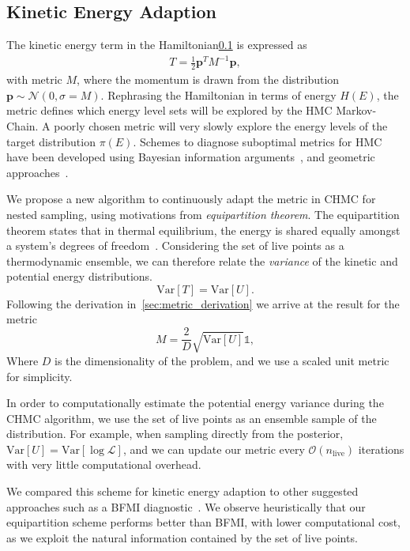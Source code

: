 \documentclass[11pt]{article}
\begin{document}
    \subsection{Kinetic Energy Adaption}
    The kinetic energy term in the Hamiltonian\ref{} is expressed as
    \begin{equation}\label{eq:kinetic_energy}
    \begin{aligned}
        T = \frac{1}{2} \mathbf{p}^T M^{-1} \mathbf{p},
    \end{aligned}
    \end{equation}
    with metric $M$, where the momentum is drawn from the distribution $\mathbf{p} \sim \mathcal{N}(0, \sigma = M)$.
    Rephrasing the Hamiltonian in terms of energy $H(E)$, the metric defines which energy level sets will be explored
    by the HMC Markov-Chain.
    A poorly chosen metric will very slowly explore the energy levels of the target distribution $\pi(E)$.
    Schemes to diagnose suboptimal metrics for HMC have been developed using Bayesian information
    arguments~\cite{betancourt2016energymetric}, and geometric approaches~\cite{bales2019_hmc_metric}.

    We propose a new algorithm to continuously adapt the metric in CHMC for nested sampling, using motivations
    from \emph{equipartition theorem}.
    The equipartition theorem states that in thermal equilibrium, the energy is shared equally amongst a system's degrees
    of freedom~\cite{landau1972theoretical}.
    Considering the set of live points as a thermodynamic ensemble, we can therefore relate the \emph{variance} of the
    kinetic and potential energy distributions.
    \begin{equation}\label{eq:equipartition_theorem}
        \mathrm{Var}[T] = \mathrm{Var}[U].
    \end{equation}
    Following the derivation in~\ref{sec:metric_derivation} we arrive at the result for the metric
    \begin{equation}\label{eq:metric_adaption}
        M = \frac{2}{D} \sqrt{\mathrm{Var}[U]} \mathbb{1},
    \end{equation}
    Where $D$ is the dimensionality of the problem, and we use a scaled unit metric for simplicity.

    In order to computationally estimate the potential energy variance during the CHMC algorithm, we use the
    set of live points as an ensemble sample of the distribution.
    For example, when sampling directly from the posterior, $\mathrm{Var}[U] = \mathrm{Var}[\log{\mathcal{L}}]$,
    and we can update our metric every $\mathcal{O}(n_{\text{live}})$ iterations with very little computational overhead.

    We compared this scheme for kinetic energy adaption to other suggested approaches such as a BFMI
    diagnostic~\cite{betancourt2016energymetric}.
    We observe heuristically that our equipartition scheme performs better than BFMI, with lower
    computational cost, as we exploit the natural information contained by the set of live points.
\end{document}

